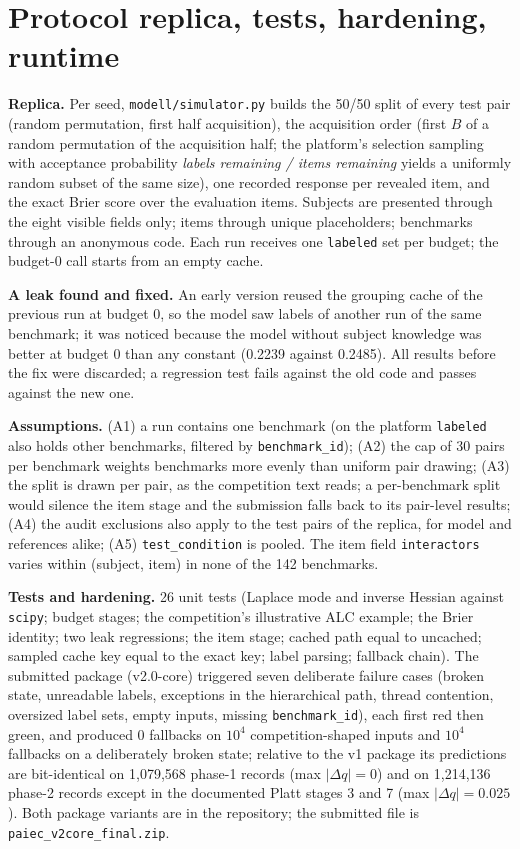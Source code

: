 \documentclass{article}
\newcommand{\pkgfile}{paiec\_v2core\_final.zip}
\begin{document}
\section{Protocol replica, tests, hardening, runtime}
\label{app:protocol}

\textbf{Replica.} Per seed, \texttt{modell/simulator.py} builds the 50/50 split of every test pair (random permutation, first
half acquisition), the acquisition order (first $B$ of a random permutation of the acquisition half; the platform's
selection sampling with acceptance probability \emph{labels remaining / items remaining} yields a uniformly random
subset of the same size), one recorded response per revealed item, and the exact Brier score over the evaluation
items. Subjects are presented through the eight visible fields only; items through unique placeholders; benchmarks
through an anonymous code. Each run receives one \texttt{labeled} set per budget; the budget-0 call starts from an
empty cache.

\textbf{A leak found and fixed.} An early version reused the grouping cache of the previous run at budget 0, so the
model saw labels of another run of the same benchmark; it was noticed because the model without subject knowledge was
better at budget 0 than any constant (0.2239 against 0.2485). All results before the fix were discarded; a regression
test fails against the old code and passes against the new one.

\textbf{Assumptions.} (A1) a run contains one benchmark (on the platform \texttt{labeled} also holds other benchmarks,
filtered by \texttt{benchmark\_id}); (A2) the cap of 30 pairs per benchmark weights benchmarks more evenly than uniform
pair drawing; (A3) the split is drawn per pair, as the competition text reads; a per-benchmark split would silence the
item stage and the submission falls back to its pair-level results; (A4) the audit exclusions also apply to the test
pairs of the replica, for model and references alike; (A5) \texttt{test\_condition} is pooled. The item field
\texttt{interactors} varies within (subject, item) in none of the 142 benchmarks.

\textbf{Tests and hardening.} 26 unit tests (Laplace mode and inverse Hessian against \texttt{scipy}; budget stages;
the competition's illustrative ALC example; the Brier identity; two leak regressions; the item stage; cached path equal
to uncached; sampled cache key equal to the exact key; label parsing; fallback chain). The submitted package (v2.0-core)
triggered seven deliberate failure cases (broken state, unreadable labels,
exceptions in the hierarchical path, thread contention, oversized label sets, empty inputs, missing
\texttt{benchmark\_id}), each first red then green, and produced 0 fallbacks on $10^4$ competition-shaped inputs and
$10^4$ fallbacks on a deliberately broken state; relative to the v1 package its predictions are bit-identical on
1,079,568 phase-1 records (max $|\Delta q| = 0$) and on 1,214,136 phase-2 records except in the documented Platt stages
3 and 7 (max $|\Delta q| = 0.025$). Both package variants are in the repository; the submitted file is \texttt{\pkgfile}.
\end{document}
